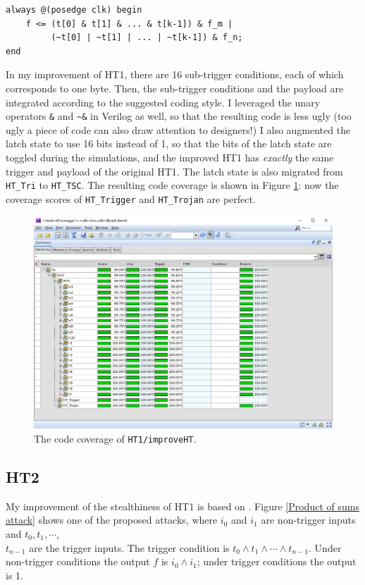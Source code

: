 \documentclass{article}
\begin{document}
\begin{verbatim}
always @(posedge clk) begin
    f <= (t[0] & t[1] & ... & t[k-1]) & f_m |
         (~t[0] | ~t[1] | ... | ~t[k-1]) & f_n;
end
\end{verbatim}

In my improvement of HT1, there are 16 sub-trigger conditions, each of which corresponds to one byte. Then, the sub-trigger conditions and the payload are integrated according to the suggested coding style. I leveraged the unary operators \verb|&| and \verb|~&| in Verilog as well, so that the resulting code is less ugly (too ugly a piece of code can also draw attention to designers!) I also augmented the latch state to use 16 bits instead of 1, so that the bits of the latch state are toggled during the simulations, and the improved HT1 has \textit{exactly} the same trigger and payload of the original HT1. The latch state is also migrated from \verb|HT_Tri| to \verb|HT_TSC|. The resulting code coverage is shown in Figure \ref{improveHT1}: now the coverage scores of \verb|HT_Trigger| and \verb|HT_Trojan| are perfect.

\begin{figure}[h] \centering
\includegraphics[width=\textwidth]{improveHT1}
\caption{The code coverage of \texttt{HT1/improveHT}.}
\label{improveHT1}
\end{figure}

\subsection{HT2}

My improvement of the stealthiness of HT1 is based on \cite{5958022}. Figure \ref{Product of sums attack} shows one of the proposed attacks, where $i_0$ and $i_1$ are non-trigger inputs and $t_0,t_1,\cdots,$\\$t_{n-1}$ are the trigger inputs. The trigger condition is $t_0\wedge t_1\wedge\cdots\wedge t_{n-1}$. Under non-trigger conditions the output $f$ is $i_0\wedge i_1$; under trigger conditions the output is 1.
\end{document}
